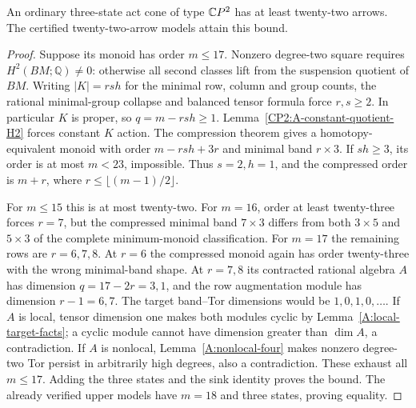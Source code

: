 \begin{theorem}
\label{CP2:A-three-state-minimum22}
An ordinary three-state act cone of type $\mathbb{C}P^2$ has at
least twenty-two arrows. The certified twenty-two-arrow
models attain this bound.
\end{theorem}
\begin{proof}
Suppose its monoid has order $m\leq17$. Nonzero degree-two
square requires $H^2(BM;\mathbb Q)\ne0$: otherwise all
second classes lift from the suspension quotient of $BM$.
Writing $|K|=rsh$ for the minimal row, column and group
counts, the rational minimal-group collapse and balanced
tensor formula force $r,s\geq2$. In particular $K$ is
proper, so $q=m-rsh\geq1$.
Lemma~\ref{CP2:A-constant-quotient-H2} forces constant
$K$ action. The compression theorem gives a homotopy-equivalent
monoid with order $m-rsh+3r$ and minimal band $r\times3$.
If $sh\geq3$, its order is at most $m<23$, impossible.
Thus $s=2,h=1$, and the compressed order is $m+r$, where
$r\leq\lfloor(m-1)/2\rfloor$.

For $m\leq15$ this is at most twenty-two. For $m=16$,
order at least twenty-three forces $r=7$, but the compressed
minimal band $7\times3$ differs from both $3\times5$ and
$5\times3$ of the complete minimum-monoid classification.
For $m=17$ the remaining rows are $r=6,7,8$. At $r=6$
the compressed monoid again has order twenty-three with
the wrong minimal-band shape. At $r=7,8$ its contracted
rational algebra $A$ has dimension $q=17-2r=3,1$, and
the row augmentation module has dimension $r-1=6,7$.
The target band--Tor dimensions would be $1,0,1,0,\ldots$.
If $A$ is local, tensor dimension one makes both modules
cyclic by Lemma~\ref{A:local-target-facts}; a cyclic module
cannot have dimension greater than $\dim A$, a contradiction.
If $A$ is nonlocal, Lemma~\ref{A:nonlocal-four} makes nonzero
degree-two Tor persist in arbitrarily high degrees, also
a contradiction. These exhaust all $m\leq17$. Adding
the three states and the sink identity proves the bound.
The already verified upper models have $m=18$ and three
states, proving equality.
\end{proof}

